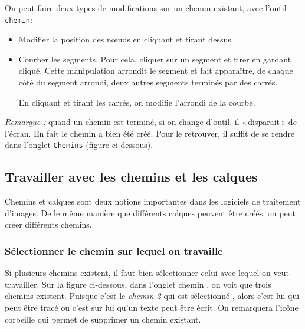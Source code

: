 On peut faire deux types de modifications sur un chemin existant, avec l'outil \texttt{chemin}: 
\begin{itemize}
\item Modifier la position des nœuds en cliquant et tirant dessus.
\item Courber les segments. Pour cela, cliquer sur un segment et tirer en gardant cliqué. Cette manipulation arrondit le segment et fait apparaître, de chaque côté du segment arrondi, deux autres segments terminés par des carrés. 


En cliquant et tirant les carrés, on modifie l'arrondi de la courbe.
\end{itemize}


\emph{Remarque :} quand un chemin est terminé, si on change d'outil, il «\,disparait\,» de l'écran. En fait le chemin a bien été créé. Pour le retrouver, il suffit de se rendre dans l'onglet \texttt{Chemins} (figure ci-dessous).








\subsection{Travailler avec les chemins et les calques}\label{Gimp3travaillerChemin}

Chemins et calques sont deux notions importantes dans les logiciels de traitement d'images. De le même manière que différents calques peuvent être créés, on peut créer différents chemins.

\subsubsection{Sélectionner le chemin sur lequel on travaille}

Si plusieurs chemins existent, il faut bien sélectionner celui avec lequel on veut travailler. Sur la figure ci-dessous, dans l'onglet chemin , on voit que trois chemins existent. Puisque c'est le \emph{chemin 2} qui est sélectionné , alors c'est lui qui peut être tracé ou c'est sur lui qu'un texte peut être écrit. On remarquera l'icône corbeille  qui permet de supprimer un chemin existant.  

